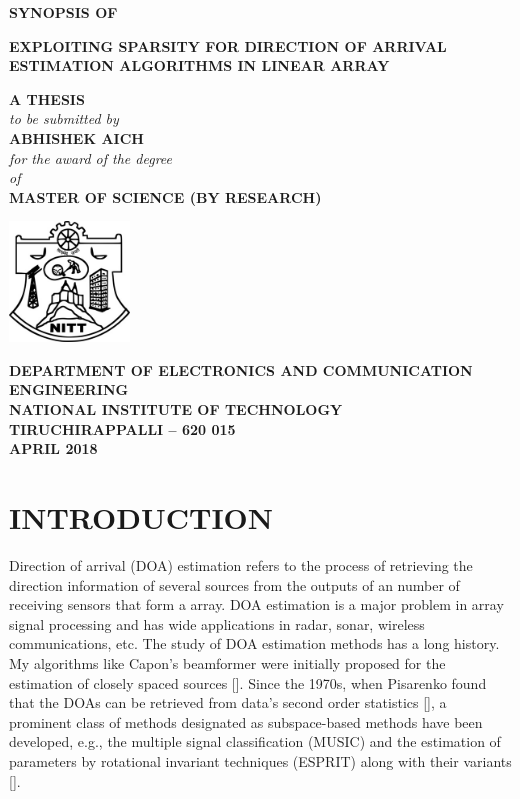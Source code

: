 \documentclass[12pt,a4paper]{article}
\theoremstyle{plain}
\theoremstyle{definition}
\begin{document}
\begin{titlepage}

\thispagestyle{empty}
\begin{center}
\thispagestyle{empty}
\normalsize
\textsc{\textbf{SYNOPSIS OF}}\\
\bigskip

\Large{\textbf{EXPLOITING SPARSITY FOR DIRECTION OF ARRIVAL ESTIMATION ALGORITHMS IN LINEAR ARRAY}}\\

\bigskip \bigskip \bigskip \bigskip \bigskip \bigskip \bigskip \bigskip


\normalsize
\textbf{A THESIS}\\
\emph{to be submitted by}\\
\bigskip \bigskip \bigskip \bigskip
\normalsize
\textbf{ABHISHEK AICH}\\
\bigskip \bigskip \bigskip \bigskip
\emph{for the award of the degree}\\ \bigskip \bigskip
\emph{of}\\
\bigskip \bigskip
\normalsize
\textbf{MASTER OF SCIENCE (BY RESEARCH)}\\
\bigskip \bigskip \bigskip \bigskip \bigskip \bigskip \bigskip \bigskip
\centering

\includegraphics[width=32mm, height=32mm]{NITT.jpg}

\bigskip \bigskip
\normalsize
\textbf{DEPARTMENT OF ELECTRONICS AND COMMUNICATION ENGINEERING} \\
\normalsize
\textbf{
NATIONAL INSTITUTE OF TECHNOLOGY\\
TIRUCHIRAPPALLI -- 620 015}\\ \bigskip
\normalsize
\textbf{APRIL 2018}

\end{center}
\end{titlepage}
\newpage
\section{INTRODUCTION}
Direction of arrival (DOA) estimation refers to the process of retrieving the direction information of several sources from the outputs of an number of receiving sensors that form a array. DOA estimation is a major problem in array signal processing and has wide applications in radar, sonar, wireless communications, etc. The study of DOA estimation methods has a long history. My algorithms like Capon’s beamformer were initially proposed for the estimation of closely spaced sources [\citet{R1}]. Since the 1970s, when Pisarenko found that the DOAs can be retrieved from data's second order statistics [\citet{R2}], a prominent class of methods designated as subspace-based methods have been developed, e.g., the multiple signal classification (MUSIC) and the estimation of parameters by rotational invariant techniques (ESPRIT) along with their variants [\citet{R3,R4,R5,R6,R7}].
\end{document}
